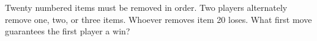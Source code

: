 Twenty numbered items must be removed in order. Two players alternately remove one, two, or three items. Whoever removes item 20 loses. What first move guarantees the first player a win?

